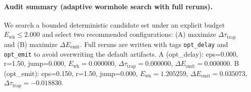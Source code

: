 \paragraph{Audit summary (adaptive wormhole search with full reruns).} \AuditTag We search a bounded deterministic candidate set under an explicit budget $E_{\mathrm{wh}}\le 2.000$ and select two recommended configurations: (A) maximize $\Delta\tau_{\mathrm{trap}}$ and (B) maximize $\Delta E_{\mathrm{emit}}$. Full reruns are written with tags \texttt{opt\_delay} and \texttt{opt\_emit} to avoid overwriting the default artifacts.
\noindent A (opt\_delay): eps=0.000, r=1.50, jump=0.000, $E_{\mathrm{wh}}=0.000000$, $\Delta\tau_{\mathrm{trap}}=0.000000$, $\Delta E_{\mathrm{emit}}=0.000000$.
\noindent B (opt\_emit): eps=0.150, r=1.50, jump=0.000, $E_{\mathrm{wh}}=1.205259$, $\Delta E_{\mathrm{emit}}=0.035073$, $\Delta\tau_{\mathrm{trap}}=-0.018830$.